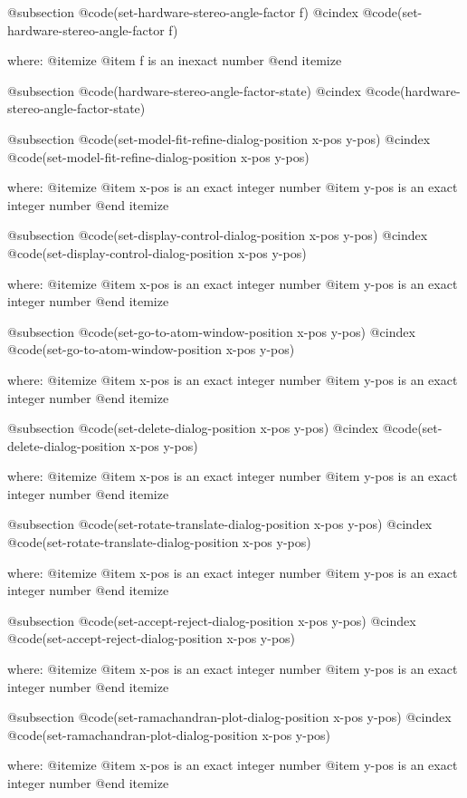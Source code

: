@subsection @code{(set-hardware-stereo-angle-factor f)}
@cindex @code{(set-hardware-stereo-angle-factor f)}
 
where: 
 @itemize 
     @item f is an inexact number
 @end itemize


@subsection @code{(hardware-stereo-angle-factor-state)}
@cindex @code{(hardware-stereo-angle-factor-state)}
 
@subsection @code{(set-model-fit-refine-dialog-position x-pos y-pos)}
@cindex @code{(set-model-fit-refine-dialog-position x-pos y-pos)}
 
where: 
 @itemize 
     @item x-pos is an exact integer number
     @item y-pos is an exact integer number
 @end itemize


@subsection @code{(set-display-control-dialog-position x-pos y-pos)}
@cindex @code{(set-display-control-dialog-position x-pos y-pos)}
 
where: 
 @itemize 
     @item x-pos is an exact integer number
     @item y-pos is an exact integer number
 @end itemize


@subsection @code{(set-go-to-atom-window-position x-pos y-pos)}
@cindex @code{(set-go-to-atom-window-position x-pos y-pos)}
 
where: 
 @itemize 
     @item x-pos is an exact integer number
     @item y-pos is an exact integer number
 @end itemize


@subsection @code{(set-delete-dialog-position x-pos y-pos)}
@cindex @code{(set-delete-dialog-position x-pos y-pos)}
 
where: 
 @itemize 
     @item x-pos is an exact integer number
     @item y-pos is an exact integer number
 @end itemize


@subsection @code{(set-rotate-translate-dialog-position x-pos y-pos)}
@cindex @code{(set-rotate-translate-dialog-position x-pos y-pos)}
 
where: 
 @itemize 
     @item x-pos is an exact integer number
     @item y-pos is an exact integer number
 @end itemize


@subsection @code{(set-accept-reject-dialog-position x-pos y-pos)}
@cindex @code{(set-accept-reject-dialog-position x-pos y-pos)}
 
where: 
 @itemize 
     @item x-pos is an exact integer number
     @item y-pos is an exact integer number
 @end itemize


@subsection @code{(set-ramachandran-plot-dialog-position x-pos y-pos)}
@cindex @code{(set-ramachandran-plot-dialog-position x-pos y-pos)}
 
where: 
 @itemize 
     @item x-pos is an exact integer number
     @item y-pos is an exact integer number
 @end itemize



